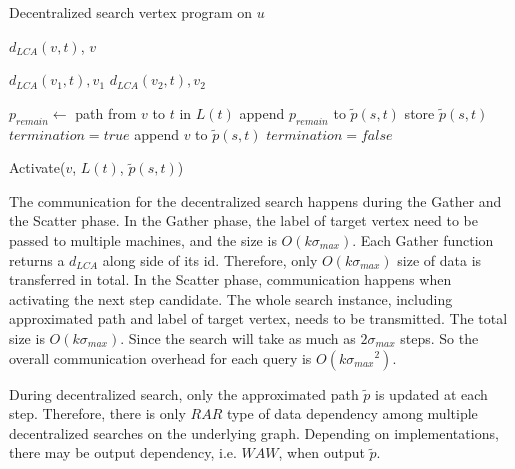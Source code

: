 \begin{algorithm}
    \caption{Decentralized search vertex program on $u$}
		\label{alg:vc_dec}
    \begin{algorithmic}
						\State \Return $d_{LCA}(v, t)$, $v$
				\EndFunction

								\State \Return $d_{LCA}(v_1,t), v_1$
						\Else
								\State \Return $d_{LCA}(v_2,t), v_2$
						\EndIf
				\EndFunction

								\State $p_{remain} \gets$ path from $v$ to $t$ in $L(t)$
								\State append $p_{remain}$ to $\tilde{p}(s,t)$
								\State store $\tilde{p}(s,t)$
								\State $termination = true$
						\Else
								\State append $v$ to $\tilde{p}(s,t)$
								\State $termination = false$
						\EndIf
				\EndFunction

						\If {$\neg termination$}
								\State Activate($v$, $L(t)$, $\tilde{p}(s,t)$)
						\EndIf
        \EndFunction
    \end{algorithmic}
\end{algorithm}
The communication for the decentralized search happens during the Gather and the Scatter phase. In the Gather phase, the label of target vertex need to be passed to multiple machines, and the size is $O(k{\sigma}_{max})$. Each Gather function returns a $d_{LCA}$ along side of its id. Therefore, only $O(k{\sigma}_{max})$ size of data is transferred in total. In the Scatter phase, communication happens when activating the next step candidate. The whole search instance, including approximated path and label of target vertex, needs to be transmitted. The total size is $O(k{\sigma}_{max})$. Since the search will take as much as $2{\sigma}_{max}$ steps. So the overall communication overhead for each query is $O(k{{\sigma}_{max}}^2)$. 

During decentralized search, only the approximated path $\tilde{p}$ is updated at each step. Therefore, there is only $RAR$ type of data dependency among multiple decentralized searches on the underlying graph. Depending on implementations, there may be output dependency, i.e. $WAW$, when output $\tilde{p}$.

